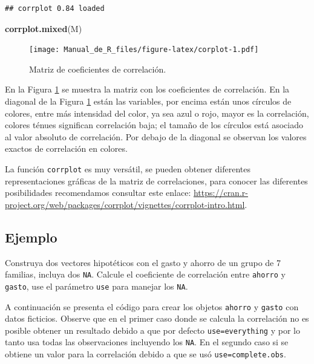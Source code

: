 \documentclass[10pt,]{krantz}
\makeatletter
\newenvironment{Shaded}{\begin{snugshade}}{\end{snugshade}}
\newcommand{\KeywordTok}[1]{\textcolor[rgb]{0.13,0.29,0.53}{\textbf{#1}}}
\newcommand{\NormalTok}[1]{#1}
\newenvironment{kframe}{%
\medskip{}
\setlength{\fboxsep}{.8em}
 \def\at@end@of@kframe{}%
 \ifinner\ifhmode%
  \def\at@end@of@kframe{\end{minipage}}%
  \begin{minipage}{\columnwidth}%
 \fi\fi%
 \def\FrameCommand##1{\hskip\@totalleftmargin \hskip-\fboxsep
 \colorbox{shadecolor}{##1}\hskip-\fboxsep
     \hskip-\linewidth \hskip-\@totalleftmargin \hskip\columnwidth}%
 \MakeFramed {\advance\hsize-\width
   \@totalleftmargin\z@ \linewidth\hsize
   \@setminipage}}%
 {\par\unskip\endMakeFramed%
 \at@end@of@kframe}
\renewenvironment{Shaded}{\begin{kframe}}{\end{kframe}}
\let\BeginKnitrBlock\begin \let\EndKnitrBlock\end
\makeatother
\begin{document}
\begin{verbatim}
## corrplot 0.84 loaded
\end{verbatim}

\begin{Shaded}
\begin{Highlighting}[]
\KeywordTok{corrplot.mixed}\NormalTok{(M)}
\end{Highlighting}
\end{Shaded}

\begin{figure}
\centering
\texttt{[image: Manual\_de\_R\_files/figure-latex/corplot-1.pdf]}
\caption{\label{fig:corplot}Matriz de coeficientes de correlación.}
\end{figure}

En la Figura \ref{fig:corplot} se muestra la matriz con los coeficientes
de correlación. En la diagonal de la Figura \ref{fig:corplot} están las
variables, por encima están unos círculos de colores, entre más
intensidad del color, ya sea azul o rojo, mayor es la correlación,
colores ténues significan correlación baja; el tamaño de los círculos
está asociado al valor absoluto de correlación. Por debajo de la
diagonal se observan los valores exactos de correlación en colores.

\BeginKnitrBlock{rmdtip}
La función \texttt{corrplot} es muy versátil, se pueden obtener
diferentes representaciones gráficas de la matriz de correlaciones, para
conocer las diferentes posibilidades recomendamos consultar este enlace:
\url{https://cran.r-project.org/web/packages/corrplot/vignettes/corrplot-intro.html}.
\EndKnitrBlock{rmdtip}

\subsection*{Ejemplo}\label{ejemplo-46}


Construya dos vectores hipotéticos con el gasto y ahorro de un grupo de
7 familias, incluya dos \texttt{NA}. Calcule el coeficiente de
correlación entre \texttt{ahorro} y \texttt{gasto}, use el parámetro
\texttt{use} para manejar los \texttt{NA}.

A continuación se presenta el código para crear los objetos
\texttt{ahorro} y \texttt{gasto} con datos ficticios. Observe que en el
primer caso donde se calcula la correlación no es posible obtener un
resultado debido a que por defecto
\texttt{use=\textquotesingle{}everything\textquotesingle{}} y por lo
tanto usa todas las observaciones incluyendo los \texttt{NA}. En el
segundo caso si se obtiene un valor para la correlación debido a que se
usó \texttt{use=\textquotesingle{}complete.obs\textquotesingle{}}.
\end{document}
